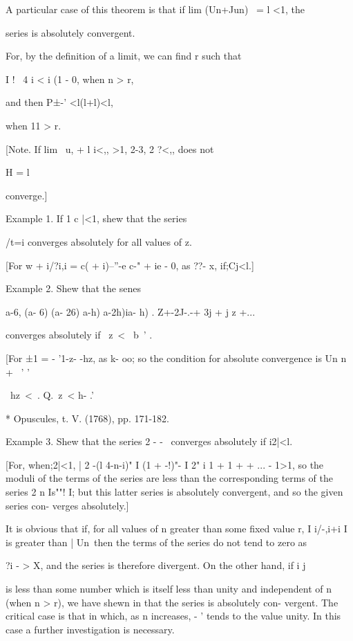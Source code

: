 A particular case of this theorem is that if lim (Un+Jun) \ = l <1,
the

series is absolutely convergent.

For, by the definition of a limit, we can find r such that

I ! \ 4 i < i (1 - 0, when n > r,

and then P±-' <l(l+l)<l,

when 11 > r.

[Note. If lim \ u, + l i<,, >1, %
2-3, 2 ?<,, does not

H = l

converge.]

Example 1. If 1 c |<1, shew that the series

/t=i converges absolutely for all values of z.

[For w + i/?i,i = c( + i)--''-e c-" + ie - 0, as ??- x, if;Cj<l.]

Example 2. Shew that the senes

a-6, (a- 6) (a- 26) a-h) a-2h)ia- h) . Z+-2J-.-+ 3j + j z +...

converges absolutely if \ z\ < \ b~' .

[For ±1 = - '1-z- -hz, as k- oo; so the condition for absolute
convergence is Un n + \ ' '

\ hz\ < \,. Q.\ z\ < h- .'\

* Opuscules, t. V. (1768), pp. 171-182.

%
%

Example 3. Shew that the series 2 - - \, converges absolutely if
i2|<l.

[For, when;2|<1, | 2 -(l 4-n-i)" I (1 + -!)"- I 2" i 1 + 1 + + ... -
1>1, so the moduli of the terms of the series are less than the
corresponding terms of the series 2 n Is""! I; but this latter series
is absolutely convergent, and so the given series con- verges
absolutely.]


It is obvious that if, for all values of n greater than some fixed
value r, I i/-,i+i I is greater than | Un\, then the terms of the
series do not tend to zero as

?i - > X, and the series is therefore divergent. On the other hand,
if i j

is less than some number which is itself less than unity and
independent of n (when n > r), we have shewn in that the series
is absolutely con- vergent. The critical case is that in which, as n
increases, - ' tends to the value unity. In this case a further
investigation is necessary.


